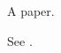 \documentclass{article}
\makeatletter
\def\citeauthoryear#1#2#3(@)(@)\@nil#4{\global\@namedef{b@#4}{#1 #2}}
\makeatother
\begin{document}
\begin{thebibliography}{}
 A paper.
\end{thebibliography}
See \cite{a}.
\end{document}
